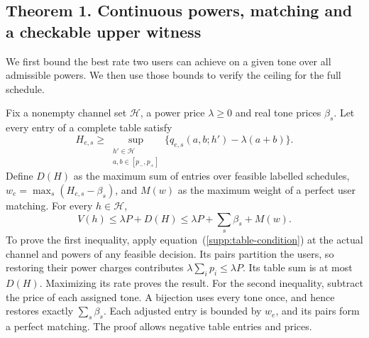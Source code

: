 \documentclass[10pt,letterpaper]{article}
\begin{document}
\subsection{Theorem 1. Continuous powers, matching and a checkable upper witness}
We first bound the best rate two users can achieve on a given tone over all admissible powers. We then use those bounds to verify the ceiling for the full schedule. 

Fix a nonempty channel set $\mathcal H$, a power price $\lambda\ge0$ and real tone prices $\beta_s$. Let every entry of a complete table satisfy
\begin{equation}
 H_{e,s}\ge\sup_{\substack{h'\in\mathcal H\\a,b\in[p_-,p_+]}}
          \{q_{e,s}(a,b;h')-\lambda(a+b)\}.
 \label{supp:table-condition}
\end{equation}
Define $D(H)$ as the maximum sum of entries over feasible labelled schedules,
$w_e=\max_s(H_{e,s}-\beta_s)$, and $M(w)$ as the maximum weight of a perfect user matching. For every $h\in\mathcal H$,
\begin{equation}
 V(h)\le\lambda P+D(H)
       \le\lambda P+\sum_s\beta_s+M(w).
 \label{supp:theorem1}
\end{equation}
To prove the first inequality, apply equation~(\ref{supp:table-condition}) at the actual channel and powers of any feasible decision. Its pairs partition the users, so restoring their power charges contributes $\lambda\sum_i p_i\le\lambda P$. Its table sum is at most $D(H)$. Maximizing its rate proves the result. For the second inequality, subtract the price of each assigned tone. A bijection uses every tone once, and hence restores exactly $\sum_s\beta_s$. Each adjusted entry is bounded by $w_e$, and its pairs form a perfect matching. The proof allows negative table entries and prices.
\end{document}
